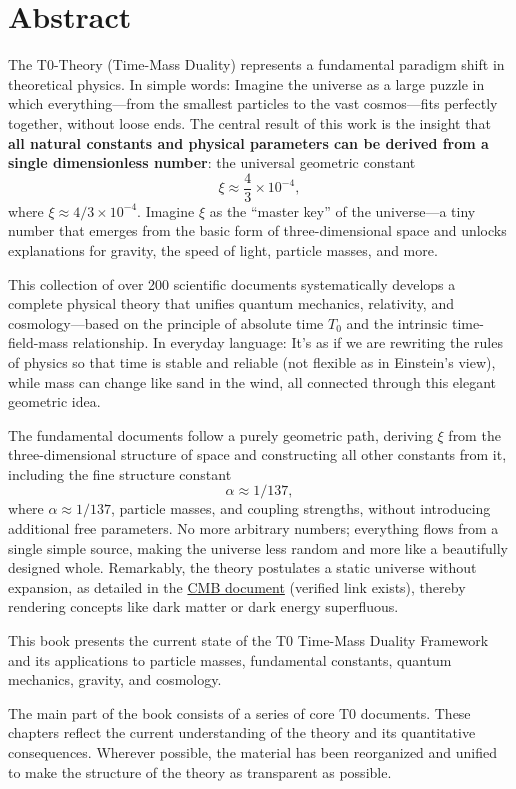 \section*{Abstract}
	The T0-Theory (Time-Mass Duality) represents a fundamental paradigm shift in theoretical physics. In simple words: Imagine the universe as a large puzzle in which everything—from the smallest particles to the vast cosmos—fits perfectly together, without loose ends. The central result of this work is the insight that \textbf{all natural constants and physical parameters can be derived from a single dimensionless number}: the universal geometric constant 
	\[
	\xi \approx \frac{4}{3} \times 10^{-4},
	\]
	where $\xi \approx 4/3 \times 10^{-4}$. Imagine $\xi$ as the ``master key'' of the universe—a tiny number that emerges from the basic form of three-dimensional space and unlocks explanations for gravity, the speed of light, particle masses, and more.
	
	This collection of over 200 scientific documents systematically develops a complete physical theory that unifies quantum mechanics, relativity, and cosmology—based on the principle of absolute time $T_0$ and the intrinsic time-field-mass relationship. In everyday language: It's as if we are rewriting the rules of physics so that time is stable and reliable (not flexible as in Einstein's view), while mass can change like sand in the wind, all connected through this elegant geometric idea. 
	
	The fundamental documents follow a purely geometric path, deriving $\xi$ from the three-dimensional structure of space and constructing all other constants from it, including the fine structure constant 
	\[
	\alpha \approx 1/137,
	\]
	where $\alpha \approx 1/137$, particle masses, and coupling strengths, without introducing additional free parameters. No more arbitrary numbers; everything flows from a single simple source, making the universe less random and more like a beautifully designed whole. Remarkably, the theory postulates a static universe without expansion, as detailed in the \href{https://github.com/jpascher/T0-Time-Mass-Duality/blob/main/2/pdf/140_T0_CMB_Donoghue_Analyse_En.pdf}{CMB document} (verified link exists), thereby rendering concepts like dark matter or dark energy superfluous.
	
	This book presents the current state of the T0 Time-Mass Duality Framework and its applications to particle masses, fundamental constants, quantum mechanics, gravity, and cosmology.
	
	The main part of the book consists of a series of core T0 documents. These chapters reflect the current understanding of the theory and its quantitative consequences. Wherever possible, the material has been reorganized and unified to make the structure of the theory as transparent as possible.
	
